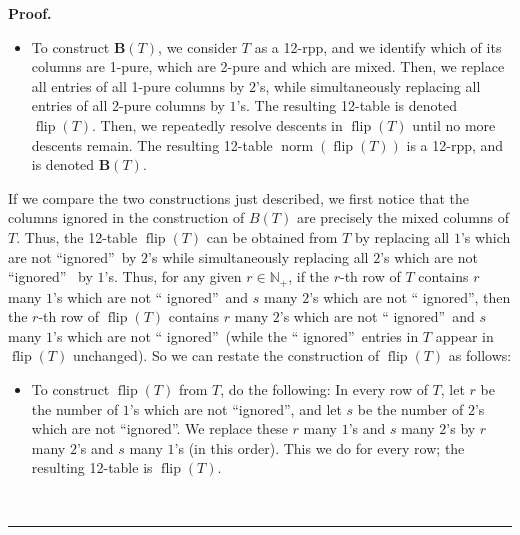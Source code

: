 \documentclass[numbers=enddot,12pt,final,onecolumn,notitlepage]{scrartcl}%
\theoremstyle{definition}
\newenvironment{proof}[1][Proof]{\noindent\textbf{#1.} }{\ \rule{0.5em}{0.5em}}
\begin{document}
\begin{proof}
\begin{itemize}
\item To construct $\mathbf{B}\left(  T\right)  $, we consider $T$ as a
12-rpp, and we identify which of its columns are 1-pure, which are 2-pure and
which are mixed. Then, we replace all entries of all 1-pure columns by $2$'s,
while simultaneously replacing all entries of all 2-pure columns by $1$'s. The
resulting 12-table is denoted $\operatorname*{flip}\left(  T\right)  $. Then,
we repeatedly resolve descents in $\operatorname*{flip}\left(  T\right)  $
until no more descents remain. The resulting 12-table $\operatorname*{norm}%
\left(  \operatorname*{flip}\left(  T\right)  \right)  $ is a 12-rpp, and is
denoted $\mathbf{B}\left(  T\right)  $.
\end{itemize}

If we compare the two constructions just described, we first notice that the
columns ignored in the construction of $B\left(  T\right)  $ are precisely the
mixed columns of $T$. Thus, the 12-table $\operatorname*{flip}\left(
T\right)  $ can be obtained from $T$ by replacing all $1$'s which are not
\textquotedblleft ignored\textquotedblright\ by $2$'s while simultaneously
replacing all $2$'s which are not \textquotedblleft ignored\textquotedblright%
\ by $1$'s. Thus, for any given $r\in\mathbb{N}_{+}$, if the $r$-th row of $T$
contains $r$ many $1$'s which are not \textquotedblleft
ignored\textquotedblright\ and $s$ many $2$'s which are not \textquotedblleft
ignored\textquotedblright, then the $r$-th row of $\operatorname*{flip}\left(
T\right)  $ contains $r$ many $2$'s which are not \textquotedblleft
ignored\textquotedblright\ and $s$ many $1$'s which are not \textquotedblleft
ignored\textquotedblright\ (while the \textquotedblleft
ignored\textquotedblright\ entries in $T$ appear in $\operatorname*{flip}%
\left(  T\right)  $ unchanged). So we can restate the construction of
$\operatorname*{flip}\left(  T\right)  $ as follows:

\begin{itemize}
\item To construct $\operatorname*{flip}\left(  T\right)  $ from $T$, do the
following: In every row of $T$, let $r$ be the number of $1$'s which are not
\textquotedblleft ignored\textquotedblright, and let $s$ be the number of
$2$'s which are not \textquotedblleft ignored\textquotedblright. We replace
these $r$ many $1$'s and $s$ many $2$'s by $r$ many $2$'s and $s$ many $1$'s
(in this order). This we do for every row; the resulting 12-table is
$\operatorname*{flip}\left(  T\right)  $.
\end{itemize}


\end{proof}
\end{document}
